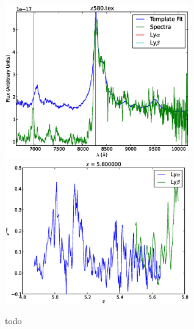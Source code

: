 \documentclass[11pt]{article}
\begin{document}
\begin{figure}[h]
  \includegraphics[width=8cm]{z580.eps}
  \includegraphics[width=8cm]{z580_Transmission.eps}
  \caption{todo}
  \label{fig:todo}
\end{figure}
\end{document}
